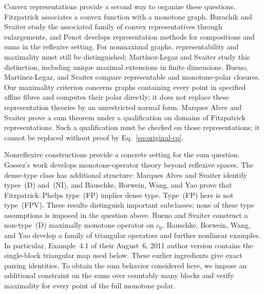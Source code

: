 Convex representations provide a second way to organize these questions.
Fitzpatrick \cite{fitzpatrick1988} associates a convex function with a
monotone graph. Burachik and Svaiter \cite{burachiksvaiter2002} study the
associated family of convex representatives through enlargements, and
Penot \cite{penot2004} develops representation methods for compositions
and sums in the reflexive setting. For nonmaximal graphs,
representability and maximality must still be distinguished;
Mart\'{i}nez-Legaz and Svaiter \cite{martinezsvaiter2005} study this
distinction, including unique maximal extensions in finite dimensions.
Bueno, Mart\'{i}nez-Legaz,
and Svaiter \cite{buenomartinezsvaiter2014} compare representable and
monotone-polar closures. Our maximality criterion concerns graphs containing
every point in specified affine fibres and computes their polar directly; it does not
replace these representation theories by an unrestricted normal form.
Marques Alves and Svaiter \cite{marquessvaiter2012} prove a sum theorem
under a qualification on domains of Fitzpatrick representations.
Such a qualification must be checked on those representations; it cannot
be replaced without proof by Eq.~\eqref{eq:original-cq}.

Nonreflexive constructions provide a concrete setting for the sum question.
Gossez's work \cite{gossez1971} develops monotone-operator theory beyond
reflexive spaces. The dense-type class has additional structure:
Marques Alves and Svaiter \cite{marquessvaiter2010} identify types~(D)
and~(NI), and Bauschke, Borwein, Wang, and Yao \cite{bauschkefp2012}
prove that Fitzpatrick--Phelps type~(FP) implies dense type.
Type~(FP) here is not type~(FPV). These results distinguish important
subclasses; none of these type assumptions is imposed in the question above.
Bueno and Svaiter \cite{buenosvaiter2011} construct a non-type~(D)
maximally monotone operator on $c_0$. Bauschke, Borwein, Wang, and Yao
\cite{bauschkeetal2011} develop a family of triangular operators and
further nonlinear examples. In particular, Example~4.1 of their
August~6, 2011 author version contains
the single-block triangular map used below. These earlier ingredients
give exact pairing identities. To obtain the sum behavior considered
here, we impose an additional constraint on the sums over countably many
blocks and verify maximality for every point of the full monotone polar.

